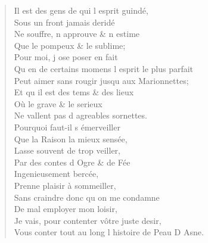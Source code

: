 \begin{verse}
Il est des gens de qui l\textquotesingle{} esprit guindé, \\
\vin Sous un front jamais deridé \\
\vin Ne souffre, n\textquotesingle{} approuve \& n\textquotesingle{} estime \\
\vin Que le pompeux \& le sublime; \\
\vin Pour moi, j\textquotesingle{} ose poser en fait \\
Qu\textquotesingle{} en de certains momens l\textquotesingle{} esprit le plus parfait \\
Peut aimer sans rougir jusqu\textquotesingle{} aux Marionnettes; \\
\vin Et qu\textquotesingle{} il est des tems \& des lieux \\
\vin Où le grave \& le serieux \\
\vin Ne vallent pas d\textquotesingle{} agreables sornettes. \\
\vin Pourquoi faut-il s\textquotesingle{} émerveiller \\
\vin Que la Raison la mieux sensée, \\
\vin Lasse souvent de trop veiller, \\
\vin Par des contes d\textquotesingle{} Ogre \& de Fée \\
\vin Ingenieusement bercée, \\
\vin Prenne plaisir à sommeiller, \\
\vin Sans craindre donc qu\textquotesingle{} on me condamne \\
\vin De mal employer mon loisir, \\
Je vais, pour contenter vôtre juste desir, \\
Vous conter tout au long l\textquotesingle{} histoire de Peau D\textquotesingle{} Asne.
\end{verse}

